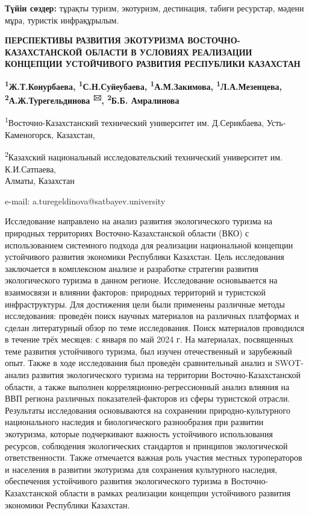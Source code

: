 {\bfseries Түйін сөздер:} тұрақты туризм, экотуризм, дестинация, табиғи
ресурстар, мәдени мұра, туристік инфрақұрылым.

{\bfseries ПЕРСПЕКТИВЫ РАЗВИТИЯ ЭКОТУРИЗМА ВОСТОЧНО-КАЗАХСТАНСКОЙ ОБЛАСТИ В
УСЛОВИЯХ РЕАЛИЗАЦИИ КОНЦЕПЦИИ УСТОЙЧИВОГО РАЗВИТИЯ РЕСПУБЛИКИ КАЗАХСТАН}

{\bfseries \textsuperscript{1}Ж.Т.Конурбаева,
\textsuperscript{1}С.Н.Суйеубаева, \textsuperscript{1}А.М.Закимова,
\textsuperscript{1}Л.А.Мезенцева,\\
\textsuperscript{2}А.Ж.Турегельдинова \textsuperscript{🖂},
\textsuperscript{2}Б.Б. Амралинова}

\textsuperscript{1}Восточно-Казахстанский технический университет им.
Д.Серикбаева, Усть-Каменогорск, Казахстан,

\textsuperscript{2}Казахский национальный исследовательский технический
университет им. К.И.Сатпаева,\\
Алматы, Казахстан

e-mail: a.turegeldinova@satbayev.university

Исследование направлено на анализ развития экологического туризма на
природных территориях Восточно-Казахстанской области (ВКО) с
использованием системного подхода для реализации национальной концепции
устойчивого развития экономики Республики Казахстан. Цель исследования
заключается в комплексном анализе и разработке стратегии развития
экологического туризма в данном регионе. Исследование основывается на
взаимосвязи и влиянии факторов: природных территорий и туристской
инфраструктуры. Для достижения цели были применены различные методы
исследования: проведён поиск научных материалов на различных платформах
и сделан литературный обзор по теме исследования. Поиск материалов
проводился в течение трёх месяцев: с января по май 2024 г. На
материалах, посвященных теме развития устойчивого туризма, был изучен
отечественный и зарубежный опыт. Также в ходе исследования был проведён
сравнительный анализ и SWOT-анализ развития экологического туризма на
территории Восточно-Казахстанской области, а также выполнен
корреляционно-регрессионный анализ влияния на ВВП региона различных
показателей-факторов из сферы туристской отрасли. Результаты
исследования основываются на сохранении природно-культурного
национального наследия и биологического разнообразия при развитии
экотуризма, которые подчеркивают важность устойчивого использования
ресурсов, соблюдения экологических стандартов и принципов экологической
ответственности. Также отмечается важная роль участия местных
туроператоров и населения в развитии экотуризма для сохранения
культурного наследия, обеспечения устойчивого развития экологического
туризма в Восточно-Казахстанской области в рамках реализации концепции
устойчивого развития экономики Республики Казахстан.

